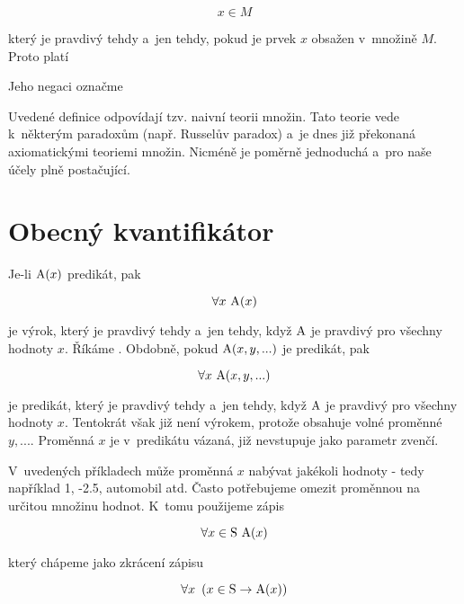 \begin{equation}
x \in M
\end{equation}

který je pravdivý tehdy a~jen tehdy, pokud je prvek \(x\) obsažen v~množině \(M\). Proto platí


Jeho negaci označme


Uvedené definice odpovídají tzv. naivní teorii množin. Tato teorie vede k~některým paradoxům (např. Russelův paradox) a~je dnes již překonaná axiomatickými teoriemi množin. Nicméně je poměrně jednoduchá a~pro naše účely plně postačující. 

\section{Obecný kvantifikátor}

Je-li \(\mathrm{A}(x)\) predikát, pak

\begin{equation}
\forall x \ \predicate{A}(x)
\end{equation}

je výrok, který je pravdivý tehdy a~jen tehdy, když \(\mathrm{A}\) je pravdivý pro všechny hodnoty \(x\). Říkáme . Obdobně, pokud \(\mathrm{A}(x, y, ...)\) je predikát, pak

\begin{equation}
\forall x \ \mathrm{A}(x, y, ...)
\end{equation}

je predikát, který je pravdivý tehdy a~jen tehdy, když \(\mathrm{A}\) je pravdivý pro všechny hodnoty \(x\). Tentokrát však již není výrokem, protože obsahuje volné proměnné \(y, ...\). Proměnná \(x\) je v~predikátu vázaná, již nevstupuje jako parametr zvenčí.

V~uvedených příkladech může proměnná \(x\) nabývat jakékoli hodnoty - tedy například 1, -2.5, automobil atd. Často potřebujeme omezit proměnnou na určitou množinu hodnot. K~tomu použijeme zápis

\begin{equation}
\forall x \in \mathrm{S} \ \predicate{A}(x)
\end{equation}

který chápeme jako zkrácení zápisu

\begin{equation}
\forall x \ \left( x \in \mathrm{S} \rightarrow \mathrm{A}(x) \right)
\end{equation}

